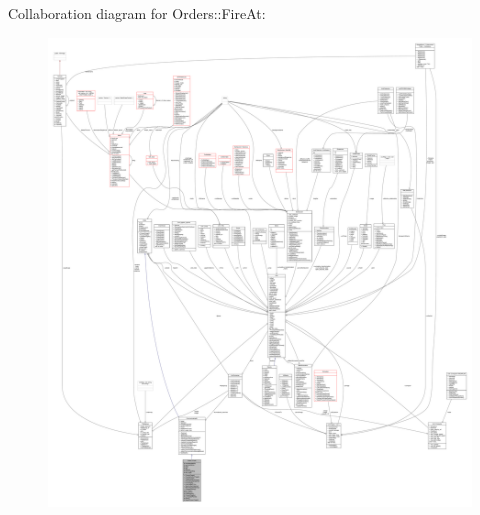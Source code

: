 Collaboration diagram for Orders\+:\+:Fire\+At\+:
\nopagebreak
\begin{figure}[H]
\begin{center}
\leavevmode
\includegraphics[width=350pt]{d6/d47/classOrders_1_1FireAt__coll__graph}
\end{center}
\end{figure}
